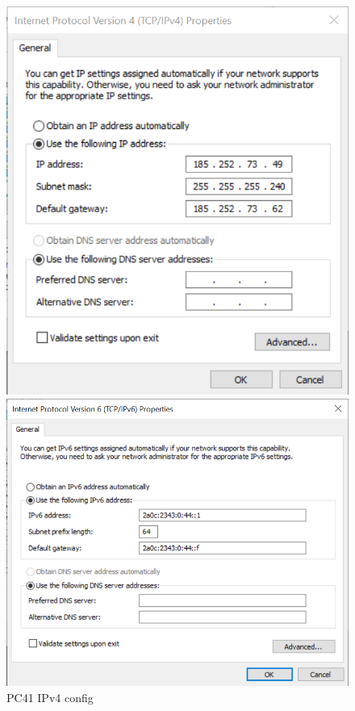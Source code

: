 \documentclass{article}
\begin{document}
\begin{figure}[!htp]
  \centering
  \begin{minipage}[b]{0.2\textwidth}
    \includegraphics[width=\textwidth]{Arbeitsergebnisse/PC41/pc41_IPv4_config.png}
    \caption{PC41 IPv4 config}
  \end{minipage}
  \hspace{0.8cm}
  \begin{minipage}[b]{0.2\textwidth}
    \includegraphics[width=\textwidth]{Arbeitsergebnisse/PC41/pc41_IPv6_config.png}

\end{minipage}
\end{figure}
\end{document}
